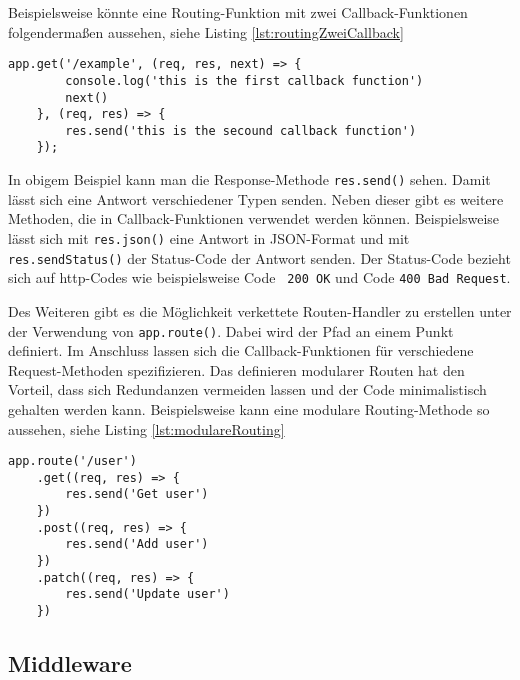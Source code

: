 Beispielsweise könnte eine Routing-Funktion mit zwei Callback-Funktionen folgendermaßen aussehen, siehe Listing \ref*{lst:routingZweiCallback}

\begin{lstlisting}[caption={Routing-Funktion mit zwei Callback-Funktionen}, label={lst:routingZweiCallback}]
    app.get('/example', (req, res, next) => {
        console.log('this is the first callback function')
        next()
    }, (req, res) => {
        res.send('this is the secound callback function')
    });
\end{lstlisting}

In obigem Beispiel kann man die Response-Methode \texttt{res.send()} sehen. Damit lässt sich eine Antwort verschiedener Typen senden. Neben dieser gibt es weitere Methoden, die in Callback-Funktionen verwendet werden können. Beispielsweise lässt sich mit \texttt{res.json()} eine Antwort in JSON-Format und mit \texttt{res.sendStatus()} der Status-Code der Antwort senden. Der Status-Code bezieht sich auf http-Codes wie beispielsweise Code  \texttt{ 200 OK} und Code  \texttt{400 Bad Request}.

Des Weiteren gibt es die Möglichkeit verkettete Routen-Handler zu erstellen unter der Verwendung von \texttt{app.route()}. Dabei wird der Pfad an einem Punkt definiert. Im Anschluss lassen sich die Callback-Funktionen für verschiedene Request-Methoden spezifizieren. Das definieren modularer Routen hat den Vorteil, dass sich Redundanzen vermeiden lassen und der Code minimalistisch gehalten werden kann. 
Beispielsweise kann eine modulare Routing-Methode so aussehen, siehe Listing \ref*{lst:modulareRouting}

\begin{lstlisting}[caption={modulare Routing Methode \cite{nfunf}}, label={lst:modulareRouting}]
    app.route('/user')
    .get((req, res) => {
        res.send('Get user')
    })
    .post((req, res) => {
        res.send('Add user')
    })
    .patch((req, res) => {
        res.send('Update user')
    })
\end{lstlisting}

\subsection{Middleware}

